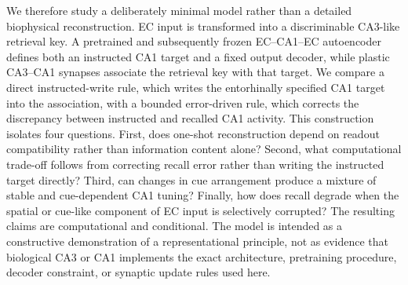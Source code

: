 We therefore study a deliberately minimal model rather than a detailed biophysical reconstruction.
EC input is transformed into a discriminable CA3-like retrieval key.
A pretrained and subsequently frozen EC--CA1--EC autoencoder defines both an instructed CA1 target and a fixed output decoder, while plastic CA3--CA1 synapses associate the retrieval key with that target.
We compare a direct instructed-write rule, which writes the entorhinally specified CA1 target into the association, with a bounded error-driven rule, which corrects the discrepancy between instructed and recalled CA1 activity.
This construction isolates four questions.
First, does one-shot reconstruction depend on readout compatibility rather than information content alone?
Second, what computational trade-off follows from correcting recall error rather than writing the instructed target directly?
Third, can changes in cue arrangement produce a mixture of stable and cue-dependent CA1 tuning?
Finally, how does recall degrade when the spatial or cue-like component of EC input is selectively corrupted? The resulting claims are computational and conditional.
The model is intended as a constructive demonstration of a representational principle, not as evidence that biological CA3 or CA1 implements the exact architecture, pretraining procedure, decoder constraint, or synaptic update rules used here.
